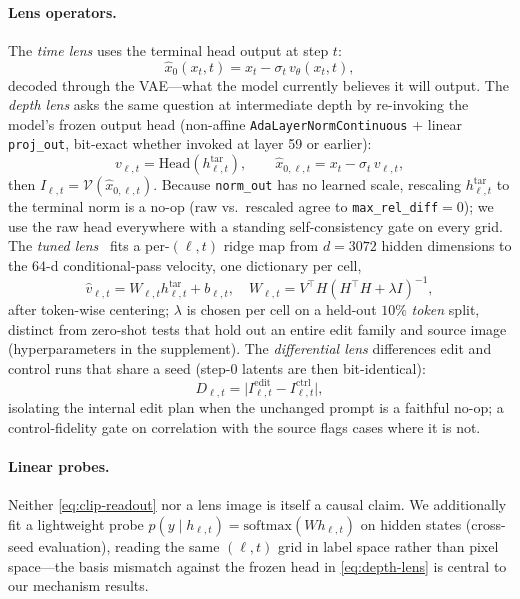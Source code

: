 \paragraph{Lens operators.}
The \emph{time lens} uses the terminal head output at step $t$:
\begin{equation}
  \hat{x}_0(x_t,t) = x_t - \sigma_t\, v_\theta(x_t,t),
  \label{eq:time-lens}
\end{equation}
decoded through the VAE---what the model currently believes it will output.
The \emph{depth lens} asks the same question at intermediate depth by
re-invoking the model's frozen output head (non-affine
\texttt{AdaLayerNormContinuous} + linear \texttt{proj\_out}, bit-exact
whether invoked at layer 59 or earlier):
\begin{equation}
  v_{\ell,t} = \mathrm{Head}(h^{\mathrm{tar}}_{\ell,t}),
  \qquad
  \hat{x}_{0,\ell,t} = x_t - \sigma_t\, v_{\ell,t},
  \label{eq:depth-lens}
\end{equation}
then $I_{\ell,t}=\mathcal{V}(\hat{x}_{0,\ell,t})$.
Because \texttt{norm\_out} has no learned scale, rescaling $h^{\mathrm{tar}}_{\ell,t}$ to
the terminal norm is a no-op (raw vs.\ rescaled agree to
\texttt{max\_rel\_diff}$=0$); we use the raw head everywhere with a
standing self-consistency gate on every grid.
The \emph{tuned lens}~\citep{belrose2023tuned} fits a per-$(\ell,t)$ ridge map
from $d{=}3072$ hidden dimensions to the $64$-d conditional-pass velocity,
one dictionary per cell,
\begin{equation}
  \hat{v}_{\ell,t} = W_{\ell,t} h^{\mathrm{tar}}_{\ell,t} + b_{\ell,t},
  \quad
  W_{\ell,t} = V^\top H (H^\top H + \lambda I)^{-1},
  \label{eq:tuned-lens}
\end{equation}
after token-wise centering; $\lambda$ is chosen per cell on a held-out
$10\%$ \emph{token} split, distinct from zero-shot tests that hold out an
entire edit family and source image (hyperparameters in the supplement).
The \emph{differential lens} differences edit and control runs that share a
seed (step-0 latents are then bit-identical):
\begin{equation}
  D_{\ell,t}
  = \bigl|I^{\mathrm{edit}}_{\ell,t}
  - I^{\mathrm{ctrl}}_{\ell,t}\bigr|,
  \label{eq:diff-lens}
\end{equation}
isolating the internal edit plan when the unchanged prompt is a faithful
no-op; a control-fidelity gate on correlation with the source flags cases
where it is not.

\paragraph{Linear probes.}
Neither \eqref{eq:clip-readout} nor a lens image is itself a causal claim.
We additionally fit a lightweight probe
$p(y \mid h_{\ell,t}) = \mathrm{softmax}(W h_{\ell,t})$ on hidden states
(cross-seed evaluation), reading the same $(\ell,t)$ grid in label space
rather than pixel space---the basis mismatch against the frozen head in
\eqref{eq:depth-lens} is central to our mechanism results.

